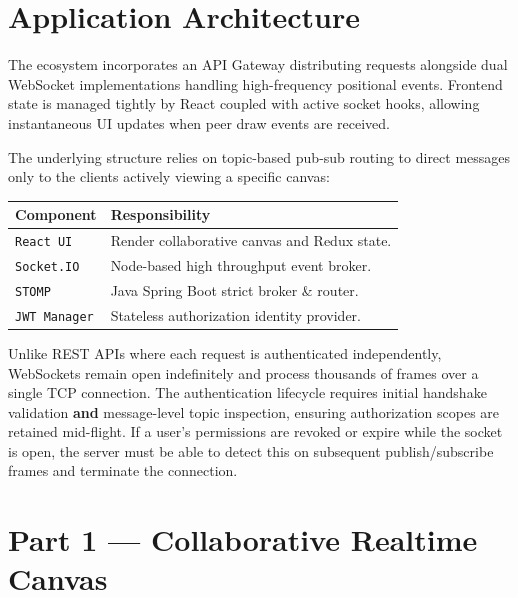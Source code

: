 \documentclass[10pt,a4paper,twocolumn]{article}
\begin{document}
\section{Application Architecture}

The ecosystem incorporates an API Gateway distributing requests alongside dual 
WebSocket implementations handling high-frequency positional events. 
Frontend state is managed tightly by React coupled with active socket hooks, 
allowing instantaneous UI updates when peer draw events are received.

The underlying structure relies on topic-based pub-sub routing to direct messages 
only to the clients actively viewing a specific canvas:

\begin{center}
\small
\begin{tabular}{@{}ll@{}}
\toprule
\textbf{Component} & \textbf{Responsibility} \\
\midrule
\texttt{React UI} & Render collaborative canvas and Redux state. \\
\texttt{Socket.IO} & Node-based high throughput event broker. \\
\texttt{STOMP} & Java Spring Boot strict broker \& router. \\
\texttt{JWT Manager} & Stateless authorization identity provider. \\
\bottomrule
\end{tabular}
\end{center}

\begin{warningbox}
Unlike REST APIs where each request is authenticated independently, WebSockets remain open indefinitely 
and process thousands of frames over a single TCP connection. The authentication 
lifecycle requires initial handshake validation \textbf{and} message-level topic 
inspection, ensuring authorization scopes are retained mid-flight. If a user's permissions 
are revoked or expire while the socket is open, the server must be able to detect this on 
subsequent publish/subscribe frames and terminate the connection.
\end{warningbox}

\section{Part 1 --- Collaborative Realtime Canvas}
\end{document}
